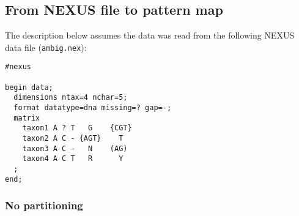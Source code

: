 \subsection{From NEXUS file to pattern map}

The description below assumes the data was read from the following NEXUS data file ({\tt ambig.nex}):
\begin{verbatim}
#nexus

begin data;
  dimensions ntax=4 nchar=5;
  format datatype=dna missing=? gap=-;
  matrix
	taxon1 A ? T   G    {CGT}
	taxon2 A C - {AGT}    T 
	taxon3 A C -   N    (AG)
	taxon4 A C T   R      Y
  ;
end;
\end{verbatim}

\subsubsection{No partitioning}

